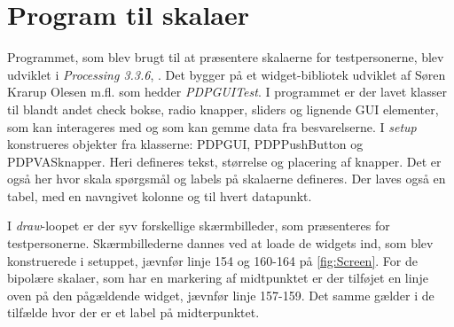 \section{Program til skalaer}
\label{TestAfSkalaProgramSkala}
%
Programmet, som blev brugt til at præsentere skalaerne for testpersonerne, blev udviklet i \textit{Processing 3.3.6}, \parencite{WEB:Processing3}. Det bygger på et widget-bibliotek udviklet af Søren Krarup Olesen m.fl. som hedder \textit{PDPGUITest}. I programmet er der lavet klasser til blandt andet check bokse, radio knapper, sliders og lignende GUI elementer, som kan interageres med og som kan gemme data fra besvarelserne.\blankline 
%
I \textit{setup} konstrueres objekter fra klasserne: PDPGUI, PDPPushButton og PDPVASknapper. Heri defineres tekst, størrelse og placering af knapper. Det er også her hvor skala spørgsmål og labels på skalaerne defineres. Der laves også en tabel, med en navngivet kolonne og til hvert datapunkt.

I \textit{draw}-loopet er der syv forskellige skærmbilleder, som præsenteres for testpersonerne. Skærmbillederne dannes ved at loade de widgets ind, som blev konstruerede i setuppet, jævnfør linje 154 og 160-164 på \autoref{fig:Screen}. For de bipolære skalaer, som har en markering af midtpunktet er der tilføjet en linje oven på den pågældende widget, jævnfør linje 157-159. Det samme gælder i de tilfælde hvor der er et label på midterpunktet.
 
